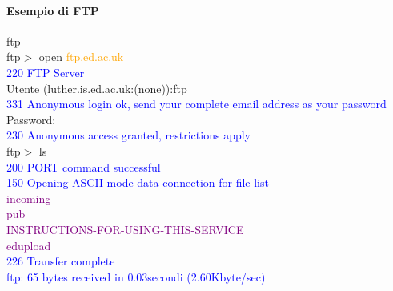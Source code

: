 \paragraph{Esempio di FTP}
\begin{mdframed}
    ftp\\
    ftp$>$ open \textcolor{orange}{ftp.ed.ac.uk}\\
    \textcolor{blue}{220 FTP Server}\\
    Utente (luther.is.ed.ac.uk:(none)):ftp\\
    \textcolor{blue}{331 Anonymous login ok, send your complete email address as your password}\\
    Password:\\
    \textcolor{blue}{230 Anonymous access granted, restrictions apply}\\
    ftp$>$ ls\\
    \textcolor{blue}{200 PORT command successful\\
    150 Opening ASCII mode data connection for file list}\\
    \textcolor{purple}{incoming\\
    pub\\
    INSTRUCTIONS-FOR-USING-THIS-SERVICE\\
    edupload\\}
    \textcolor{blue}{226 Transfer complete\\
    ftp: 65 bytes received in 0.03secondi (2.60Kbyte/sec)}
\end{mdframed}
